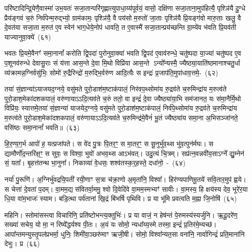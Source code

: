 परि॑ष्टादिन्द्रि॒येणै॒वास्मा॑ उभ॒यतः॑ सजा॒तान्परि॑\-गृह्णात्युपाधा॒य्य॑\-पूर्वयं॒ वासो॒ दक्षि॑णा सजा॒ताना॒मुप॑हित्यै॒ पृश्ञि॑यै दु॒ग्धे प्रैय॑ङ्गवं च॒रुं निर्व॑पेन्म॒रुद्भ्यो॒ ग्राम॑कामः॒ पृश्ञि॑यै॒ वै पय॑सो म॒रुतो॑ जा॒ताः पृश्ञि॑यै प्रि॒यङ्ग॑वो मारु॒ताः खलु॒ वै दे॒वत॑या सजा॒ता म॒रुत॑ ए॒व स्वेन॑ भाग॒धेये॒नोप॑ धावति॒ त ए॒वास्मै॑ सजा॒तान्प्रय॑च्छन्ति ग्रा॒म्ये॑व भ॑वति प्रि॒यव॑ती याज्यानुवा॒क्ये॑~(६१)

भवतः प्रि॒यमे॒वैनꣳ॑ समा॒नानां᳚ करोति द्वि॒पदा॑ पुरोनुवा॒क्या॑ भवति द्वि॒पद॑ ए॒वाव॑\-रुन्धे॒ चतु॑ष्पदा या॒ज्या॑ चतु॑ष्पद ए॒व प॒शूनव॑\-रुन्धे देवासु॒राः सं य॑त्ता आस॒न्ते दे॒वा मि॒थो विप्रि॑या आस॒न्ते \-ऽन्यो᳚न्यस्मै॒ ज्यैष्ठ्या॒याति॑ष्ठमानाश्चतु॒र्धा व्य॑क्रामन्न॒ग्निर्वसु॑भिः॒ सोमो॑ रु॒द्रैरिन्द्रो॑ म॒रुद्भि॒र्वरु॑ण आदि॒त्यैः स इन्द्रः॑ प्र॒जा\-प॑ति॒मुपा॑धाव॒त्तमे॒-~(६२)

तया॑ सं॒ज्ञान्या॑\-ऽयाजयद॒ग्नये॒ वसु॑मते पुरो॒डाश॑\-म॒ष्टा\-क॑पालं॒ निर॑वप॒थ्सोमा॑य रु॒द्रव॑ते च॒रुमिन्द्रा॑य म॒रुत्व॑ते पुरो॒डाश॒मेका॑\-दश\-कपालं॒ वरु॑णाया\-ऽऽ\-दि॒त्यव॑ते च॒रुं ततो॒ वा इन्द्रं॑ दे॒वा ज्यैष्ठ्या॑या॒भि सम॑जानत॒ यः स॑मा॒नैर्मि॒थो विप्रि॑यः॒ स्यात्तमे॒तया॑ सं॒ज्ञान्या॑ याजयेद॒ग्नये॒ वसु॑मते पुरो॒डाश॑\-म॒ष्टा\-क॑पालं॒ निर्व॑पे॒थ्सोमा॑य रु॒द्रव॑ते च॒रुमिन्द्रा॑य म॒रुत्व॑ते पुरो॒डाश॒मेका॑\-दश\-कपालं॒ वरु॑णाया\-ऽऽ\-दि॒त्यव॑ते च॒रुमिन्द्र॑मे॒वैनं॑ भू॒तं ज्यैष्ठ्या॑य समा॒ना अ॒भिसञ्जा॑नते॒ वसि॑ष्ठः समा॒नानां᳚ भवति॥~(६३)

{\anuvakamend[{विश॑मे॒व ति॑ष्ठन्त्ये॒तामे॒वाथै॒न्द्रस्य॑ याज्यानुवा॒क्ये॑ तं वरु॑णाय॒ चतु॑र्दश च}]}


हि॒र॒ण्य॒ग॒र्भ आपो॑ ह॒ यत्प्रजा॑पते। स वे॑द पु॒त्रः पि॒तर॒ꣳ॒ स मा॒तर॒ꣳ॒ स सू॒नुर्भु॑व॒थ्स भु॑व॒त्पुन॑र्मघः। स द्यामौर्णो॑द॒न्तरि॑क्ष॒ꣳ॒ स सुवः॒ स विश्वा॒ भुवो॑ अभव॒थ्स आ\-ऽभ॑वत्। उदु॒त्यं चि॒त्रम्। सप्र॑त्न॒वन्नवी॑य॒सा\-ऽग्ने᳚ द्यु॒म्नेन॑ सं॒ यता᳚। बृ॒हत्त॑तन्थ भा॒नुना᳚। निकाव्या॑ वे॒धसः॒ शश्व॑तस्क॒र्॒\mbox{}हस्ते॒ दधा॑नो॒~-~(६४)

नर्या॑ पु॒रूणि॑। अ॒ग्निर्भु॑वद्रयि॒पती॑ रयी॒णाꣳ स॒त्रा च॑क्रा॒णो अ॒मृता॑नि॒ विश्वा᳚। हिर॑ण्यपाणिमू॒तये॑ सवि॒तार॒मुप॑ ह्वये। स चेत्ता॑ दे॒वता॑ प॒दम्। वा॒मम॒द्य स॑वितर्वा॒ममु॒ श्वो दि॒वेदि॑वे वा॒मम॒स्मभ्यꣳ॑ सावीः। वा॒मस्य॒ हि क्षय॑स्य देव॒ भूरे॑र॒या धि॒या वा॑म॒भाजः॑ स्याम। बडि॒त्था पर्व॑तानां खि॒द्रं बि॑भर्\mbox{}षि पृथिवि। प्र या भू॑मि प्रवत्वति म॒ह्ना जि॒नोषि॑~(६५)

महिनि। स्तोमा॑सस्त्वा विचारिणि॒ प्रति॑ष्टोभन्त्य॒क्तुभिः॑। प्र या वाजं॒ न हेष॑न्तं पे॒रुमस्य॑स्यर्जुनि। ऋ॒दू॒दरे॑ण॒ सख्या॑ सचेय॒ यो मा॒ न रिष्ये᳚द्धर्यश्व पी॒तः। अ॒यं यः सोमो॒ न्यधा᳚य्य॒स्मे तस्मा॒ इन्द्रं॑ प्र॒तिर॑मे॒म्यच्छ॑। आपा᳚न्तमन्युस्तृ॒पल॑प्रभर्मा॒ धुनिः॒ शिमी॑वा॒ञ्छरु॑माꣳ ऋजी॒षी। सोमो॒ विश्वा᳚न्यत॒सा वना॑नि॒ नार्वागिन्द्रं॑ प्रति॒माना॑नि देभुः। प्र~(६६)

